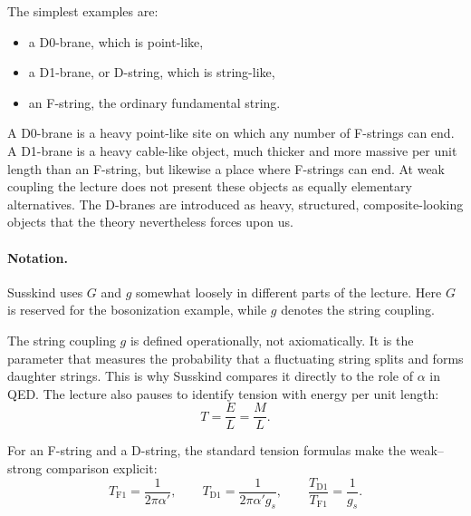 The simplest examples are:
\begin{itemize}
\item a D0-brane, which is point-like,
\item a D1-brane, or D-string, which is string-like,
\item an F-string, the ordinary fundamental string.
\end{itemize}
A D0-brane is a heavy point-like site on which any number of F-strings can end. A D1-brane is a heavy cable-like object, much thicker and more massive per unit length than an F-string, but likewise a place where F-strings can end. At weak coupling the lecture does not present these objects as equally elementary alternatives. The D-branes are introduced as heavy, structured, composite-looking objects that the theory nevertheless forces upon us.


\paragraph{Notation.}
Susskind uses \(G\) and \(g\) somewhat loosely in different parts of the lecture. Here \(G\) is reserved for the bosonization example, while \(g\) denotes the string coupling.

The string coupling \(g\) is defined operationally, not axiomatically. It is the parameter that measures the probability that a fluctuating string splits and forms daughter strings. This is why Susskind compares it directly to the role of \(\alpha\) in QED. The lecture also pauses to identify tension with energy per unit length:
\begin{equation}
T=\frac{E}{L}=\frac{M}{L}.
\end{equation}

For an F-string and a D-string, the standard tension formulas make the weak--strong comparison explicit:
\begin{equation}
T_{\mathrm{F1}}=\frac{1}{2\pi\alpha'},
\qquad
T_{\mathrm{D1}}=\frac{1}{2\pi\alpha' g_s},
\qquad
\frac{T_{\mathrm{D1}}}{T_{\mathrm{F1}}}=\frac{1}{g_s}.
\end{equation}

